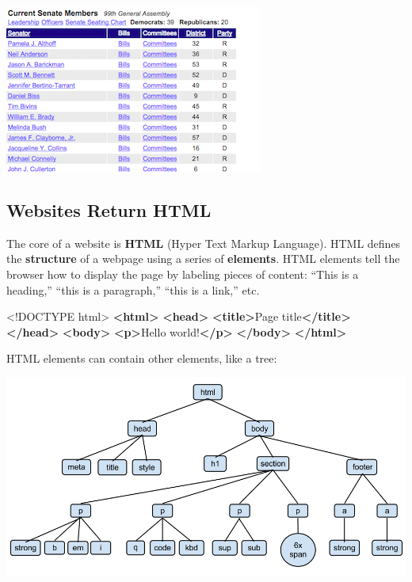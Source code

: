 \documentclass[
]{book}
\newenvironment{Shaded}{\begin{snugshade}}{\end{snugshade}}
\newcommand{\DataTypeTok}[1]{\textcolor[rgb]{0.13,0.29,0.53}{#1}}
\newcommand{\KeywordTok}[1]{\textcolor[rgb]{0.13,0.29,0.53}{\textbf{#1}}}
\newcommand{\NormalTok}[1]{#1}
\begin{document}
\begin{center}\includegraphics[width=0.7\linewidth]{img/layout} \end{center}

\hypertarget{websites-return-html}{%
\subsection{Websites Return HTML}\label{websites-return-html}}

The core of a website is \textbf{HTML} (Hyper Text Markup Language). HTML defines the \textbf{structure} of a webpage using a series of \textbf{elements}. HTML elements tell the browser how to display the page by labeling pieces of content: ``This is a heading,'' ``this is a paragraph,'' ``this is a link,'' etc.

\begin{Shaded}
\begin{Highlighting}[]
\DataTypeTok{<!DOCTYPE }\NormalTok{html}\DataTypeTok{>}
\KeywordTok{<html>}
    \KeywordTok{<head>}
        \KeywordTok{<title>}\NormalTok{Page title}\KeywordTok{</title>}
    \KeywordTok{</head>}
    \KeywordTok{<body>}
        \KeywordTok{<p>}\NormalTok{Hello world!}\KeywordTok{</p>}
    \KeywordTok{</body>}
\KeywordTok{</html>}
\end{Highlighting}
\end{Shaded}

HTML elements can contain other elements, like a tree:

\begin{center}\includegraphics[width=0.7\linewidth]{img/HTMLDOMTree} \end{center}
\end{document}
